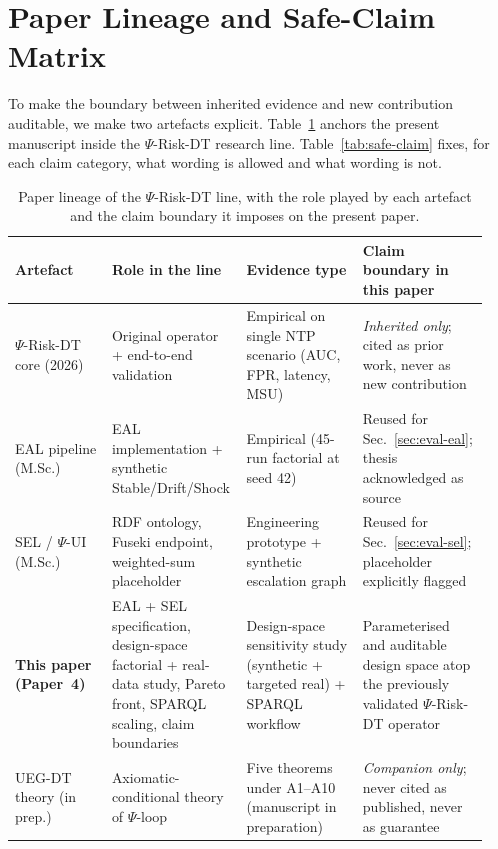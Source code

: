 \documentclass[futureinternet,article,submit,pdftex,moreauthors]{Definitions/mdpi}
\newcommand{\psiop}{\ensuremath{\Psi}}
\begin{document}
\section{Paper Lineage and Safe-Claim Matrix}
\label{sec:lineage}

To make the boundary between inherited evidence and new contribution
auditable, we make two artefacts explicit. Table~\ref{tab:lineage}
anchors the present manuscript inside the $\psiop$-Risk-DT research
line. Table~\ref{tab:safe-claim} fixes, for each claim category, what
wording is allowed and what wording is not.

\begin{table}[t]
\centering
\caption{Paper lineage of the $\psiop$-Risk-DT line, with the role
played by each artefact and the claim boundary it imposes on the present
paper.}
\label{tab:lineage}
\small
\begin{tabular}{@{}p{0.20\linewidth}p{0.24\linewidth}p{0.24\linewidth}p{0.26\linewidth}@{}}
\toprule
\textbf{Artefact} & \textbf{Role in the line} & \textbf{Evidence type}
  & \textbf{Claim boundary in this paper} \\
\midrule
\cite{paper3} $\psiop$-Risk-DT core (2026) &
Original operator + end-to-end validation &
Empirical on single NTP scenario (AUC, FPR, latency, MSU) &
\emph{Inherited only}; cited as prior work, never as new contribution \\
\cite{berto2026} EAL pipeline (M.Sc.) &
EAL implementation + synthetic Stable/Drift/Shock &
Empirical (45-run factorial at seed 42) &
Reused for Sec.~\ref{sec:eval-eal}; thesis acknowledged as source \\
\cite{vartic2026} SEL / $\psiop$-UI (M.Sc.) &
RDF ontology, Fuseki endpoint, weighted-sum placeholder &
Engineering prototype + synthetic escalation graph &
Reused for Sec.~\ref{sec:eval-sel}; placeholder explicitly flagged \\
\textbf{This paper (Paper~4)} &
EAL + SEL specification, design-space factorial + real-data study,
Pareto front, SPARQL scaling, claim boundaries &
Design-space sensitivity study (synthetic + targeted real) + SPARQL
workflow &
Parameterised and auditable design space atop the previously
validated $\psiop$-Risk-DT operator \\
\cite{paper5} UEG-DT theory (in prep.) &
Axiomatic-conditional theory of $\psiop$-loop &
Five theorems under A1--A10 (manuscript in preparation) &
\emph{Companion only}; never cited as published, never as guarantee \\
\bottomrule
\end{tabular}
\end{table}
\end{document}
